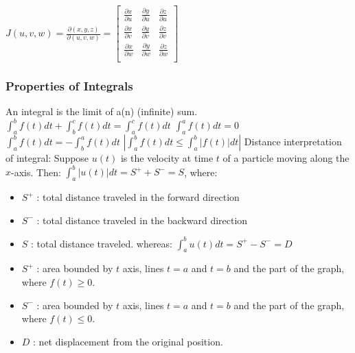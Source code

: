 \documentclass[12pt]{article}
\begin{document}
\begin{flushleft}
	\textbullet \quad $\displaystyle J(u,v,w) = \frac{\partial (x,y,z)}{\partial (u,v,w)} = 
	\begin{bmatrix}
	\frac{\partial x}{\partial u} & \frac{\partial y}{\partial u} & \frac{\partial z}{\partial u} \\ 
	\frac{\partial x}{\partial v} & \frac{\partial y}{\partial v} & \frac{\partial z}{\partial v} \\
	\frac{\partial x}{\partial w} & \frac{\partial y}{\partial w} & \frac{\partial z}{\partial w} \\
	\end{bmatrix}$ \linebreak 
	
	\subsubsection{Properties of Integrals}	
	
	\textbullet \quad An integral is the limit of a(n) (infinite) sum. \linebreak 
	\textbullet \quad $\displaystyle \int_a^b f(t) dt + \int_b^c f(t) dt = \int_a^c f(t) dt $ \linebreak 
	\textbullet \quad $\displaystyle \int_a^a f(t) dt = 0 $ \linebreak 
	\textbullet \quad $\displaystyle \int_a^b f(t) dt = -\int_b^a f(t) dt$ \linebreak 
	\textbullet \quad $\displaystyle \left| \int_a^b f(t) dt \leq \int_a^b |f(t)| dt \right| $ \linebreak 
	\textbullet \quad Distance interpretation of integral: Suppose $u(t)$ is the velocity at time $t$ of a particle moving along the $x$-axis. Then: $\displaystyle \int_a^b \left| u(t) \right| dt = S^+ + S^- = S $, where:  
	\begin{itemize}
		\renewcommand{\labelitemi}{$\rightarrow$}
	\item $S^+$  :  total distance traveled in the forward direction 
	\item $S^-$  :  total distance traveled in the backward direction 
	\item $S$  :  total distance traveled.
	whereas: $\displaystyle  \int_a^b u(t) dt = S^+ - S^- = D $ \linebreak 
	\item $S^+$  :  area bounded by $t$ axis, lines $t=a$ and $t=b$ and the part of the graph, where $f(t) \geq 0 $. 
	\item $S^-$  :  area bounded by $t$ axis, lines $t=a$ and $t=b$ and the part of the graph, where $f(t) \leq 0 $. 
	\item $D$  :  net displacement from the original position. 
	\end{itemize}
		

\end{flushleft}
\end{document}
